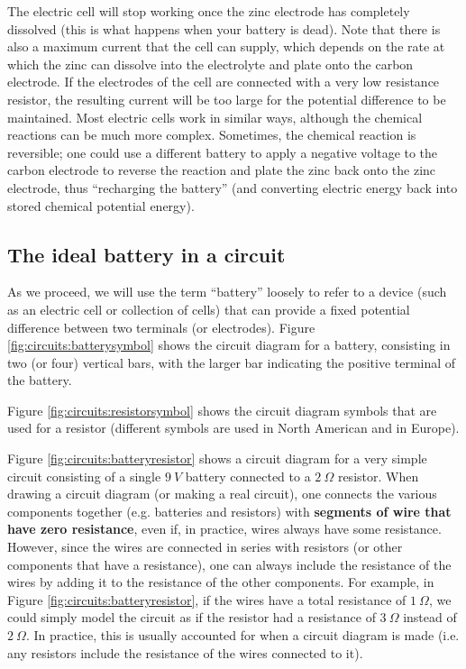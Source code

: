 The electric cell will stop working once the zinc electrode has completely dissolved (this is what happens when your battery is dead). Note that there is also a maximum current that the cell can supply, which depends on the rate at which the zinc can dissolve into the electrolyte and plate onto the carbon electrode. If the electrodes of the cell are connected with a very low resistance resistor, the resulting current will be too large for the potential difference to be maintained. Most electric cells work in similar ways, although the chemical reactions can be much more complex. Sometimes, the chemical reaction is reversible; one could use a different battery to apply a negative voltage to the carbon electrode to reverse the reaction and plate the zinc back onto the zinc electrode, thus ``recharging the battery'' (and converting electric energy back into stored chemical potential energy). 

\subsection{The ideal battery in a circuit}
As we proceed, we will use the term ``battery'' loosely to refer to a device (such as an electric cell or collection of cells) that can provide a fixed potential difference between two terminals (or electrodes). Figure \ref{fig:circuits:batterysymbol} shows the circuit diagram for a battery, consisting in two (or four) vertical bars, with the larger bar indicating the positive terminal of the battery.


Figure \ref{fig:circuits:resistorsymbol} shows the circuit diagram symbols that are used for a resistor (different symbols are used in North American and in Europe).


Figure \ref{fig:circuits:batteryresistor} shows a circuit diagram for a very simple circuit consisting of a single $\SI{9}{V}$ battery connected to a $\SI{2}{\Omega}$ resistor. When drawing a circuit diagram (or making a real circuit), one connects the various components together (e.g. batteries and resistors) with \textbf{segments of wire that have zero resistance}, even if, in practice, wires always have some resistance. However, since the wires are connected in series with resistors (or other components that have a resistance), one can always include the resistance of the wires by adding it to the resistance of the other components. For example, in Figure \ref{fig:circuits:batteryresistor}, if the wires have a total resistance of $\SI{1}{\Omega}$, we could simply model the circuit as if the resistor had a resistance of $\SI{3}{\Omega}$ instead of $\SI{2}{\Omega}$. In practice, this is usually accounted for when a circuit diagram is made (i.e. any resistors include the resistance of the wires connected to it). 

